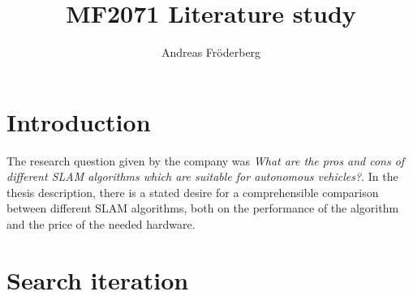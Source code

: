 \documentclass[a4paper, 12pt]{article}
\title{MF2071 Literature study}
\author{Andreas Fr\"{o}derberg}
\begin{document}
\maketitle
\pagebreak
\section*{Introduction}
The research question given by the company was \textit{What are the pros and 
    cons of different SLAM algorithms which are suitable for autonomous vehicles?}.
In the thesis description, there is a stated desire for a comprehensible 
comparison between different SLAM algorithms, both on the performance of the 
algorithm and the price of the needed hardware. 






\pagebreak
\section*{Search iteration}






\pagebreak


\end{document}
